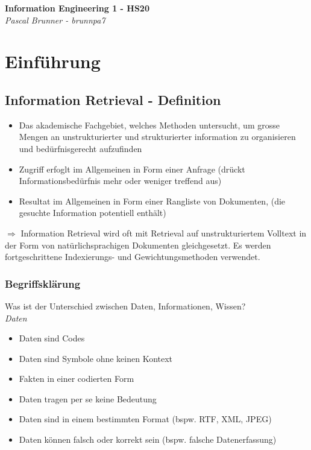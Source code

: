 \documentclass{report}
\newenvironment{Figure}
	{\par\medskip\noindent\minipage{\linewidth}}
	{\endminipage\par\medskip}
\theoremstyle{definition}
\theoremstyle{example}
\begin{document}
\begin{titlepage}
   \begin{center}
      \Large\textbf{Information Engineering 1 - HS20}\\
      \large\textit{Pascal Brunner - brunnpa7}
   \end{center}
\end{titlepage}


\tableofcontents

\newpage

\chapter{Einführung}


\section{Information Retrieval - Definition}
\begin{itemize}
   \item Das akademische Fachgebiet, welches Methoden untersucht, um grosse Mengen an unstrukturierter und strukturierter information zu organisieren und bedürfnisgerecht aufzufinden
   \item Zugriff erfoglt im Allgemeinen in Form einer Anfrage (drückt Informationsbedürfnis mehr oder weniger treffend aus)
   \item Resultat im Allgemeinen in Form einer Rangliste von Dokumenten, (die gesuchte Information potentiell enthält)
\end{itemize}
$\Rightarrow$ Information Retrieval wird oft mit Retrieval auf unstrukturiertem Volltext in der Form von natürlichsprachigen Dokumenten gleichgesetzt.
Es werden fortgeschrittene Indexierungs- und Gewichtungsmethoden verwendet.

\subsection{Begriffsklärung}
Was ist der Unterschied zwischen Daten, Informationen, Wissen?\\
\textit{Daten}
\begin{itemize}
   \item Daten sind Codes
   \item Daten sind Symbole ohne keinen Kontext
   \item Fakten in einer codierten Form
   \item Daten tragen per se keine Bedeutung
   \item Daten sind in einem bestimmten Format (bspw. RTF, XML, JPEG)
   \item Daten können falsch oder korrekt sein (bspw. falsche Datenerfassung)
\end{itemize}
\end{document}
